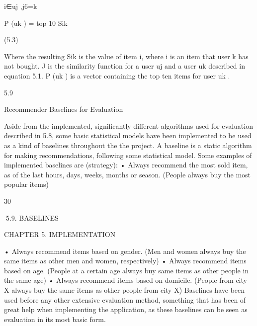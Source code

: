 i∈uj ,j6=k

P (uk ) = top 10 Sik

(5.3)

Where the resulting Sik is the value of item i, where i is an item that user k has not
bought. J is the similarity function for a user uj and a user uk described in equation
5.1. P (uk ) is a vector containing the top ten items for user uk .

5.9

Recommender Baselines for Evaluation

Aside from the implemented, significantly different algorithms used for evaluation described in 5.8, some basic statistical models have been implemented to be used as a
kind of baselines throughout the the project. A baseline is a static algorithm for making recommendations, following some statistical model. Some examples of implemented
baselines are (strategy):
• Always recommend the most sold item, as of the last hours, days, weeks, months
or season. (People always buy the most popular items)

30

5.9. BASELINES

CHAPTER 5. IMPLEMENTATION

• Always recommend items based on gender. (Men and women always buy the same
items as other men and women, respectively)
• Always recommend items based on age. (People at a certain age always buy same
items as other people in the same age)
• Always recommend items based on domicile. (People from city X always buy the
same items as other people from city X)
Baselines have been used before any other extensive evaluation method, something that
has been of great help when implementing the application, as these baselines can be seen
as evaluation in its most basic form.

